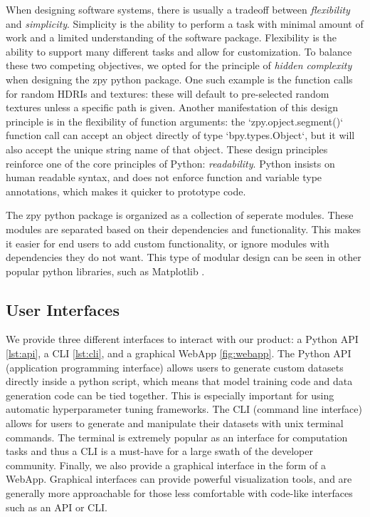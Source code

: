 \documentclass{article}
\begin{document}
When designing software systems, there is usually a tradeoff between \emph{flexibility} and \emph{simplicity}. Simplicity is the ability to perform a task with minimal amount of work and a limited understanding of the software package. Flexibility is the ability to support many different tasks and allow for customization. To balance these two competing objectives, we opted for the principle of \emph{hidden complexity} when designing the zpy python package. One such example is the function calls for random HDRIs and textures: these will default to pre-selected random textures unless a specific path is given. Another manifestation of this design principle is in the flexibility of function arguments: the `zpy.opject.segment()` function call can accept an object directly of type `bpy.types.Object`, but it will also accept the unique string name of that object. These design principles reinforce one of the core principles of Python: \emph{readability}. Python insists on human readable syntax, and does not enforce function and variable type annotations, which makes it quicker to prototype code.


The zpy python package is organized as a collection of seperate modules. These modules are separated based on their dependencies and functionality. This makes it easier for end users to add custom functionality, or ignore modules with dependencies they do not want. This type of modular design can be seen in other popular python libraries, such as Matplotlib \cite{Hunter:2007}.

\subsection{User Interfaces}
\label{sec:userinterfaces}

We provide three different interfaces to interact with our product: a Python API \ref{lst:api}, a CLI \ref{lst:cli}, and a graphical WebApp \ref{fig:webapp}. The Python API (application programming interface) allows users to generate custom datasets directly inside a python script, which means that model training code and data generation code can be tied together. This is especially important for using automatic hyperparameter tuning frameworks. The CLI (command line interface) allows for users to generate and manipulate their datasets with unix terminal commands. The terminal is extremely popular as an interface for computation tasks and thus a CLI is a must-have for a large swath of the developer community. Finally, we also provide a graphical interface in the form of a WebApp. Graphical interfaces can provide powerful visualization tools, and are generally more approachable for those less comfortable with code-like interfaces such as an API or CLI. 
\end{document}
